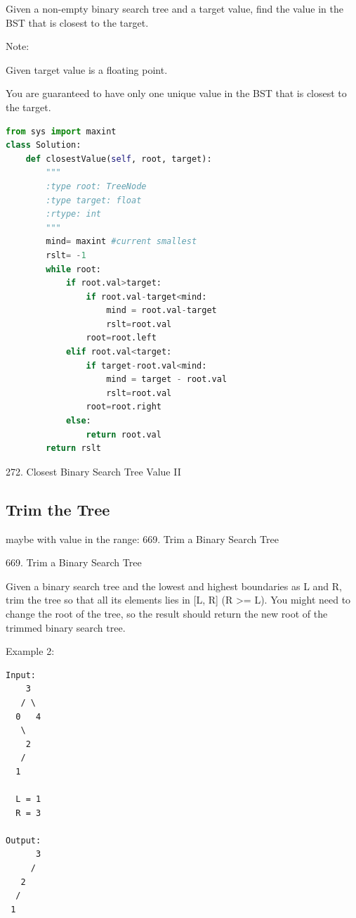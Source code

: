 \documentclass[../main.tex]{subfiles}
\begin{document}
Given a non-empty binary search tree and a target value, find the value in the BST that is closest to the target.

Note:

    Given target value is a floating point.
    
    You are guaranteed to have only one unique value in the BST that is closest to the target.
\begin{lstlisting}[language = Python]
from sys import maxint
class Solution:
    def closestValue(self, root, target):
        """
        :type root: TreeNode
        :type target: float
        :rtype: int
        """
        mind= maxint #current smallest
        rslt= -1
        while root:
            if root.val>target:
                if root.val-target<mind:
                    mind = root.val-target
                    rslt=root.val
                root=root.left
            elif root.val<target:
                if target-root.val<mind:
                    mind = target - root.val
                    rslt=root.val
                root=root.right
            else:
                return root.val
        return rslt
\end{lstlisting}
272. Closest Binary Search Tree Value II
\subsection{Trim the Tree}
maybe with value in the range: 669. Trim a Binary Search Tree

669. Trim a Binary Search Tree

Given a binary search tree and the lowest and highest boundaries as L and R, trim the tree so that all its elements lies in [L, R] (R >= L). You might need to change the root of the tree, so the result should return the new root of the trimmed binary search tree.

Example 2:
\begin{lstlisting}
Input: 
    3
   / \
  0   4
   \
    2
   /
  1

  L = 1
  R = 3

Output: 
      3
     / 
   2   
  /
 1
 \end{lstlisting}
\end{document}
